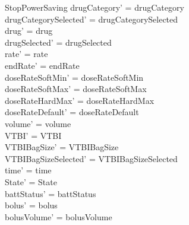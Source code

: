 \begin{schema}{StopPowerSaving}
	drugCategory' = drugCategory\\ 
	\pagebreak
	drugCategorySelected' = drugCategorySelected\\
	drug' = drug\\ drugSelected' = drugSelected\\
	rate' = rate\\
	endRate' = endRate\\
	doseRateSoftMin' = doseRateSoftMin\\
	doseRateSoftMax' = doseRateSoftMax\\
	doseRateHardMax' = doseRateHardMax\\
	doseRateDefault' = doseRateDefault\\
	volume' = volume\\
	VTBI' = VTBI\\
	VTBIBagSize' = VTBIBagSize\\ VTBIBagSizeSelected' = VTBIBagSizeSelected\\
	time' = time\\ State' = State\\
	battStatus' = battStatus\\
	bolus' = bolus\\
	bolusVolume' = bolusVolume\\

\end{schema}
